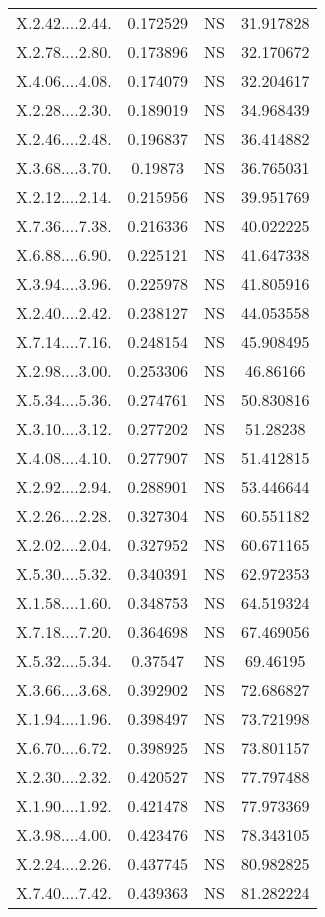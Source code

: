 \documentclass[]{article}
\begin{document}
\begin{longtable}{ c c c c }
X.2.42....2.44. & 0.172529 & NS & 31.917828\\
X.2.78....2.80. & 0.173896 & NS & 32.170672\\
X.4.06....4.08. & 0.174079 & NS & 32.204617\\
X.2.28....2.30. & 0.189019 & NS & 34.968439\\
X.2.46....2.48. & 0.196837 & NS & 36.414882\\
X.3.68....3.70. & 0.19873 & NS & 36.765031\\
X.2.12....2.14. & 0.215956 & NS & 39.951769\\
X.7.36....7.38. & 0.216336 & NS & 40.022225\\
X.6.88....6.90. & 0.225121 & NS & 41.647338\\
X.3.94....3.96. & 0.225978 & NS & 41.805916\\
X.2.40....2.42. & 0.238127 & NS & 44.053558\\
X.7.14....7.16. & 0.248154 & NS & 45.908495\\
X.2.98....3.00. & 0.253306 & NS & 46.86166\\
X.5.34....5.36. & 0.274761 & NS & 50.830816\\
X.3.10....3.12. & 0.277202 & NS & 51.28238\\
X.4.08....4.10. & 0.277907 & NS & 51.412815\\
X.2.92....2.94. & 0.288901 & NS & 53.446644\\
X.2.26....2.28. & 0.327304 & NS & 60.551182\\
X.2.02....2.04. & 0.327952 & NS & 60.671165\\
X.5.30....5.32. & 0.340391 & NS & 62.972353\\
X.1.58....1.60. & 0.348753 & NS & 64.519324\\
X.7.18....7.20. & 0.364698 & NS & 67.469056\\
X.5.32....5.34. & 0.37547 & NS & 69.46195\\
X.3.66....3.68. & 0.392902 & NS & 72.686827\\
X.1.94....1.96. & 0.398497 & NS & 73.721998\\
X.6.70....6.72. & 0.398925 & NS & 73.801157\\
X.2.30....2.32. & 0.420527 & NS & 77.797488\\
X.1.90....1.92. & 0.421478 & NS & 77.973369\\
X.3.98....4.00. & 0.423476 & NS & 78.343105\\
X.2.24....2.26. & 0.437745 & NS & 80.982825\\
X.7.40....7.42. & 0.439363 & NS & 81.282224\\

\end{longtable}
\end{document}
